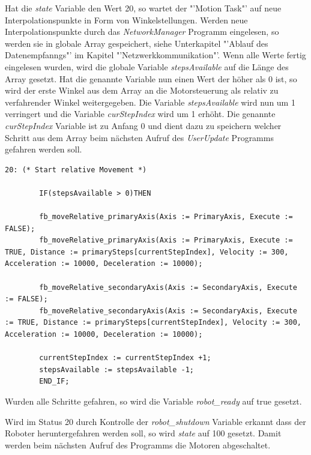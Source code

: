Hat die \textit{state} Variable den Wert 20, so wartet der "'Motion Task"' auf neue Interpolationspunkte in Form von Winkelstellungen. Werden neue Interpolationspunkte durch das \textit{NetworkManager} Programm eingelesen, so werden sie in globale Array gespeichert, siehe Unterkapitel "'Ablauf des Datenempfanngs"' im Kapitel "'Netzwerkkommunikation"'. Wenn alle Werte fertig eingelesen wurden, wird die globale Variable \textit{stepsAvailable} auf die Länge des Array gesetzt. Hat die genannte Variable nun einen Wert der höher als 0 ist, so wird der erste Winkel aus dem Array an die Motorsteuerung als relativ zu verfahrender Winkel weitergegeben. Die Variable \textit{stepsAvailable} wird nun um 1 verringert und die Variable \textit{curStepIndex} wird um 1 erhöht. Die genannte \textit{curStepIndex} Variable ist zu Anfang 0 und dient dazu zu speichern welcher Schritt aus dem Array beim nächsten Aufruf des \textit{UserUpdate} Programms gefahren werden soll.
\begin{lstlisting}[language = codesysls, captionpos=b, caption={Übergabe der Winkel an die Motoren}]
20: (* Start relative Movement *)

		IF(stepsAvailable > 0)THEN

		fb_moveRelative_primaryAxis(Axis := PrimaryAxis, Execute := FALSE);
		fb_moveRelative_primaryAxis(Axis := PrimaryAxis, Execute := TRUE, Distance := primarySteps[currentStepIndex], Velocity := 300, Acceleration := 10000, Deceleration := 10000);

		fb_moveRelative_secondaryAxis(Axis := SecondaryAxis, Execute := FALSE);
		fb_moveRelative_secondaryAxis(Axis := SecondaryAxis, Execute := TRUE, Distance := primarySteps[currentStepIndex], Velocity := 300, Acceleration := 10000, Deceleration := 10000);

		currentStepIndex := currentStepIndex +1;
		stepsAvailable := stepsAvailable -1;
		END_IF;
\end{lstlisting}

Wurden alle Schritte gefahren, so wird die Variable \textit{robot\_ready} auf true gesetzt. 

Wird im Status 20 durch Kontrolle der \textit{robot\_shutdown} Variable erkannt dass der Roboter heruntergefahren werden soll, so wird \textit{state} auf 100 gesetzt. Damit werden beim nächsten Aufruf des Programms die  Motoren abgeschaltet.




